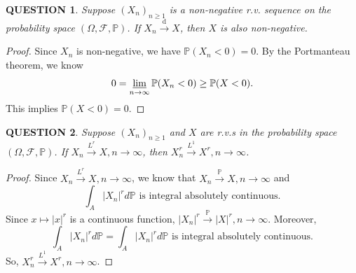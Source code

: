 \documentclass[12pt]{article}
\renewcommand{\(}{\left(}%
\renewcommand{\)}{\right)}%
\renewcommand{\[}{\left[}%
\renewcommand{\]}{\right]}%
\newcommand{\p}{\mathbb{P}}
\newcommand{\f}{\mathscr{F}}
\newtheorem{question}{QUESTION}[section]}
\newtheorem{proof}{Proof.}}
\begin{document}
  \begin{question}
  	Suppose $(X_n)_{n\geq 1}$ is a non-negative r.v. sequence on the probability space $(\Omega,\f,\p)$. If $X_n\overset{\mathrm{d}}{\to}X$, then $X$ is also non-negative.
  \end{question}
  \begin{proof}
  	Since $X_n$ is non-negative, we have $\p(X_n<0)=0$. By the Portmanteau theorem, we know 
  	\begin{equation*}
  		0=\varliminf_{n\to\infty}\p(X_n<0)\geq \p(X<0).
  	\end{equation*}
  	This implies $\p(X<0)=0$.
  \end{proof}
  
  \begin{question}
  	Suppose $(X_n)_{n\geq 1}$ and $X$ are r.v.s in the probability space $(\Omega,\f,\p)$. If $X_n\overset{L^r}{\to}X,n\to\infty$, then $X^r_n\overset{L^1}{\to}X^r,n\to\infty$.
  \end{question}
	\begin{proof}
		Since $X_n\overset{L^r}{\to}X,n\to\infty$, we know that $X_n\overset{\p}{\to}X,n\to\infty$ and
		\begin{equation*}
			\int_A |X_n|^rd\p\text{ is integral absolutely continuous.}
		\end{equation*}
		Since $x\mapsto |x|^r$ is a continuous function, $|X_n|^r\overset{\p}{\to}|X|^r,n\to\infty$. Moreover,
		\begin{equation*}
			\int_A |X_n|^rd\p=\int_A |X_n|^rd\p\text{ is integral absolutely continuous.}
		\end{equation*}
		So, $X^r_n\overset{L^1}{\to}X^r,n\to\infty$.
	\end{proof}
	
\end{document}
